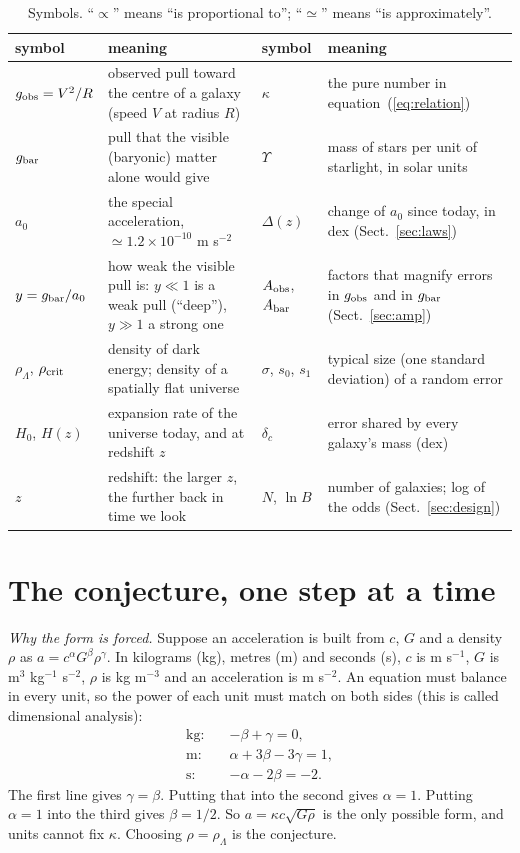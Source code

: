 \documentclass[fleqn,usenatbib]{mnras}
\begin{document}
\begin{table}
\caption{Symbols. ``$\propto$'' means ``is proportional to''; ``$\simeq$'' means ``is approximately''.}
\label{tab:symbols}
\begin{tabular}{p{}p{}p{}p{}}
\toprule
symbol & meaning & symbol & meaning\\
\midrule
$g_{\rm obs}=V^2/R$ & observed pull toward the centre of a galaxy (speed $V$ at radius $R$) & $\kappa$ & the pure number in equation~(\ref{eq:relation})\\
$g_{\rm bar}$ & pull that the visible (baryonic) matter alone would give & $\Upsilon$ & mass of stars per unit of starlight, in solar units\\
$a_0$ & the special acceleration, $\simeq1.2\times10^{-10}$ m s$^{-2}$ & $\Delta(z)$ & change of $a_0$ since today, in dex (Sect.~\ref{sec:laws})\\
$y=g_{\rm bar}/a_0$ & how weak the visible pull is: $y\ll1$ is a weak pull (``deep''), $y\gg1$ a strong one & $A_{\rm obs}$, $A_{\rm bar}$ & factors that magnify errors in $g_{\rm obs}$ and in $g_{\rm bar}$ (Sect.~\ref{sec:amp})\\
$\rho_\Lambda$, $\rho_{\rm crit}$ & density of dark energy; density of a spatially flat universe & $\sigma$, $s_0$, $s_1$ & typical size (one standard deviation) of a random error\\
$H_0$, $H(z)$ & expansion rate of the universe today, and at redshift $z$ & $\delta_c$ & error shared by every galaxy's mass (dex)\\
$z$ & redshift: the larger $z$, the further back in time we look & $N$, $\ln B$ & number of galaxies; log of the odds (Sect.~\ref{sec:design})\\
\bottomrule
\end{tabular}
\end{table}

\section{The conjecture, one step at a time}
\label{sec:relation}
\emph{Why the form is forced.} Suppose an acceleration is built from $c$, $G$ and a density $\rho$ as $a=c^{\alpha}G^{\beta}\rho^{\gamma}$. In kilograms (kg), metres (m) and seconds (s), $c$ is m s$^{-1}$, $G$ is m$^3$ kg$^{-1}$ s$^{-2}$, $\rho$ is kg m$^{-3}$ and an acceleration is m s$^{-2}$. An equation must balance in every unit, so the power of each unit must match on both sides (this is called dimensional analysis):
\begin{equation}
\begin{aligned}
\text{kg:}\quad & -\beta+\gamma=0,\\
\text{m:}\quad & \alpha+3\beta-3\gamma=1,\\
\text{s:}\quad & -\alpha-2\beta=-2 .
\end{aligned}
\label{eq:dims}
\end{equation}
The first line gives $\gamma=\beta$. Putting that into the second gives $\alpha=1$. Putting $\alpha=1$ into the third gives $\beta=1/2$. So $a=\kappa c\sqrt{G\rho}$ is the only possible form, and units cannot fix $\kappa$. Choosing $\rho=\rho_\Lambda$ is the conjecture.
\end{document}
